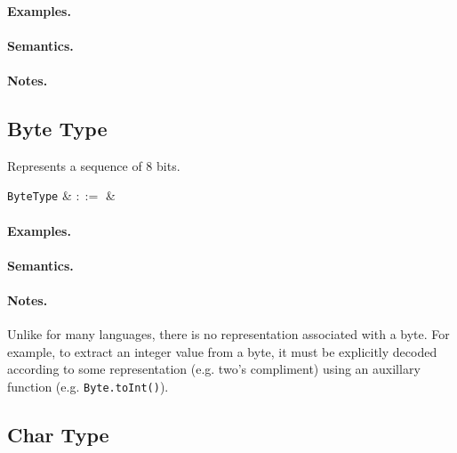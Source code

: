 \paragraph{Examples.}

\paragraph{Semantics.}

\paragraph{Notes.} 


\subsection{Byte Type}

Represents a sequence of 8 bits. 

\begin{syntax}
 \verb+ByteType+ & $::=$ &  \\
\end{syntax}

\paragraph{Examples.}

\paragraph{Semantics.}

\paragraph{Notes.}  Unlike for many languages, there is no
representation associated with a byte. For example, to extract an
integer value from a byte, it must be explicitly decoded according to
some representation (e.g. two's compliment) using an auxillary function (e.g. \lstinline{Byte.toInt()}).



\subsection{Char Type}

